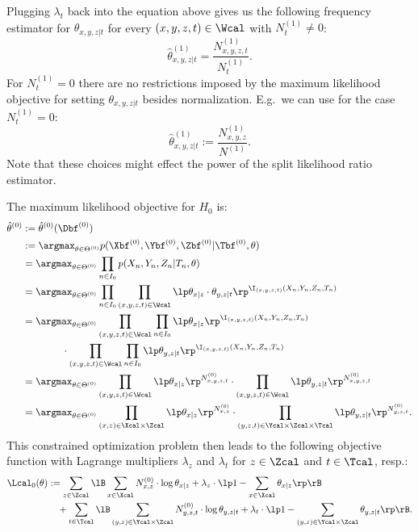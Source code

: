 Plugging $\lambda_t$ back into the equation above gives us the following frequency estimator for $\theta_{x,y,z|t}$ 
for every $(x,y,z,t) \in \Wcal$ with $N_{t}^{(1)} \neq 0$:
\[ \hat \theta_{x,y,z|t}^{(1)} = \frac{N_{x,y,z,t}^{(1)}}{N_{t}^{(1)}}.\]
For $N_{t}^{(1)} = 0$ there are no restrictions imposed by the maximum likelihood objective for setting $\theta_{x,y,z|t}$ besides normalization. 
E.g.\ we can use for the case $N_{t}^{(1)} = 0$:
\[ \hat \theta_{x,y,z|t}^{(1)} := \frac{N_{x,y,z}^{(1)}}{N^{(1)}}.\]
Note that these choices might effect the power of the split likelihood ratio estimator.

The maximum likelihood objective for $H_0$ is:
\begin{align*} \hat \theta^{(0)} &:= \hat \theta^{(0)}(\Dbf^{(0)}) \\
&:= \argmax_{\theta \in\Theta^{(0)}} p(\Xbf^{(0)},\Ybf^{(0)},\Zbf^{(0)}|\Tbf^{(0)},\theta) \\
&= \argmax_{\theta \in\Theta^{(0)}} \prod_{n \in I_0}  p(X_n,Y_n,Z_n|T_n,\theta) \\
&= \argmax_{\theta \in\Theta^{(0)}}  \prod_{n \in I_0}\prod_{(x,y,z,t)\in \Wcal} \lp \theta_{x|z} \cdot \theta_{y,z|t} \rp^{\I_{(x,y,z,t)}(X_n,Y_n,Z_n,T_n)} \\
&= \argmax_{\theta \in\Theta^{(0)}} \prod_{(x,y,z,t)\in \Wcal}\prod_{n \in I_0} \lp \theta_{x|z}  \rp^{\I_{(x,y,z,t)}(X_n,Y_n,Z_n,T_n)}\\ 
& \qquad \qquad \cdot \prod_{(x,y,z,t)\in \Wcal}\prod_{n \in I_0} \lp \theta_{y,z|t} \rp^{\I_{(x,y,z,t)}(X_n,Y_n,Z_n,T_n)} \\
&= \argmax_{\theta \in\Theta^{(0)}} \prod_{(x,y,z,t)\in \Wcal}\lp \theta_{x|z}  \rp^{N_{x,y,z,t}^{(0)}} \cdot \prod_{(x,y,z,t)\in \Wcal} \lp \theta_{y,z|t} \rp^{N_{x,y,z,t}^{(0)}} \\
&= \argmax_{\theta \in\Theta^{(0)}} \prod_{(x,z)\in \Xcal\times\Zcal}\lp \theta_{x|z}  \rp^{N_{x,z}^{(0)}} \cdot \prod_{(y,z,t)\in \Ycal\times\Zcal\times\Tcal} \lp \theta_{y,z|t} \rp^{N_{y,z,t}^{(0)}}.
\end{align*}
This constrained optimization problem then leads to the following objective function with Lagrange multipliers
$\lambda_z$ and $\lambda_t$ for $z \in \Zcal$ and $t \in \Tcal$, resp.:
\begin{align*}
    \Lcal_0(\theta) &:= \sum_{z\in \Zcal} \lB \sum_{x \in \Xcal}  N_{x,z}^{(0)} \cdot \log  \theta_{x|z}   
    + \lambda_z \cdot \lp 1- \sum_{x \in \Xcal} \theta_{x|z} \rp\rB \\ 
      &\quad   + \sum_{t\in \Tcal} \lB \sum_{(y,z)\in \Ycal\times\Zcal}   N_{y,z,t}^{(0)} \cdot \log \theta_{y,z|t} 
      + \lambda_t \cdot \lp 1 - \sum_{(y,z) \in \Ycal\times\Zcal} \theta_{y,z|t}  \rp \rB.
\end{align*}
